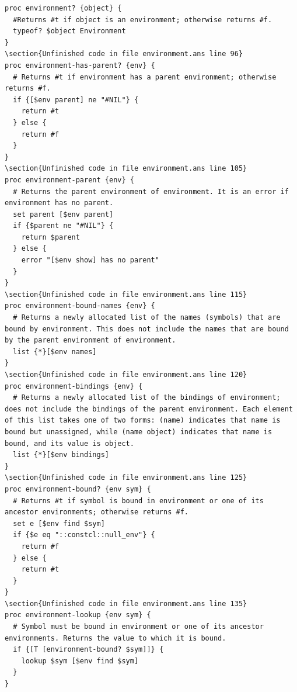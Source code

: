 \documentclass[twoside,9pt]{report}
\begin{document}
\begin{lstlisting}
proc environment? {object} {
  #Returns #t if object is an environment; otherwise returns #f.
  typeof? $object Environment
}
\section{Unfinished code in file environment.ans line 96}
proc environment-has-parent? {env} {
  # Returns #t if environment has a parent environment; otherwise returns #f.
  if {[$env parent] ne "#NIL"} {
    return #t
  } else {
    return #f
  }
}
\section{Unfinished code in file environment.ans line 105}
proc environment-parent {env} {
  # Returns the parent environment of environment. It is an error if environment has no parent.
  set parent [$env parent]
  if {$parent ne "#NIL"} {
    return $parent
  } else {
    error "[$env show] has no parent"
  }
}
\section{Unfinished code in file environment.ans line 115}
proc environment-bound-names {env} {
  # Returns a newly allocated list of the names (symbols) that are bound by environment. This does not include the names that are bound by the parent environment of environment.
  list {*}[$env names]
}
\section{Unfinished code in file environment.ans line 120}
proc environment-bindings {env} {
  # Returns a newly allocated list of the bindings of environment; does not include the bindings of the parent environment. Each element of this list takes one of two forms: (name) indicates that name is bound but unassigned, while (name object) indicates that name is bound, and its value is object.
  list {*}[$env bindings]
}
\section{Unfinished code in file environment.ans line 125}
proc environment-bound? {env sym} {
  # Returns #t if symbol is bound in environment or one of its ancestor environments; otherwise returns #f.
  set e [$env find $sym]
  if {$e eq "::constcl::null_env"} {
    return #f
  } else {
    return #t
  }
}
\section{Unfinished code in file environment.ans line 135}
proc environment-lookup {env sym} {
  # Symbol must be bound in environment or one of its ancestor environments. Returns the value to which it is bound.
  if {[T [environment-bound? $sym]]} {
    lookup $sym [$env find $sym]
  }
}

\end{lstlisting}
\end{document}
